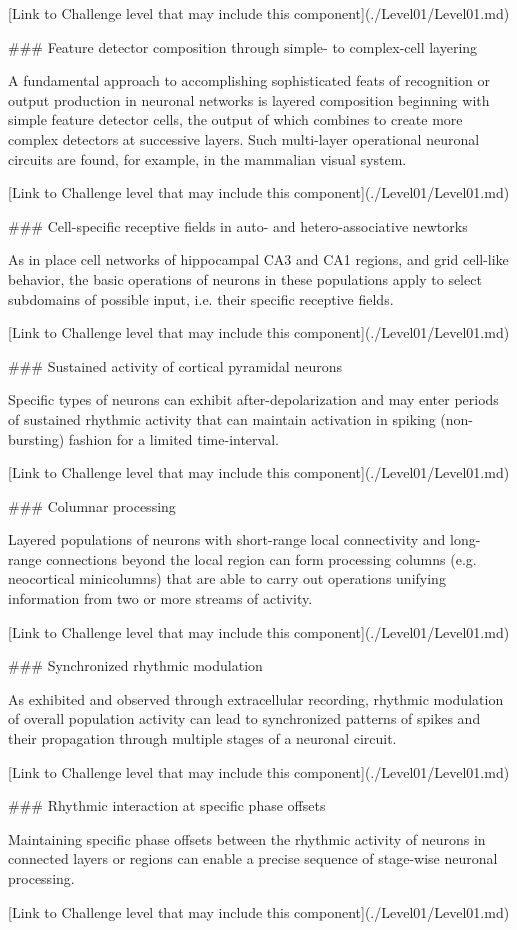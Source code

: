 \documentclass{ldr-article}
\begin{document}
[Link to Challenge level that may include this component](./Level01/Level01.md)

### Feature detector composition through simple- to complex-cell layering

A fundamental approach to accomplishing sophisticated feats of recognition or output
production in neuronal networks is layered composition beginning with simple feature
detector cells, the output of which combines to create more complex detectors at
successive layers. Such multi-layer operational neuronal circuits are found, for example,
in the mammalian visual system.

[Link to Challenge level that may include this component](./Level01/Level01.md)

### Cell-specific receptive fields in auto- and hetero-associative newtorks

As in place cell networks of hippocampal CA3 and CA1 regions, and grid cell-like behavior, the
basic operations of neurons in these populations apply to select subdomains of possible
input, i.e. their specific receptive fields.

[Link to Challenge level that may include this component](./Level01/Level01.md)

### Sustained activity of cortical pyramidal neurons

Specific types of neurons can exhibit after-depolarization and may enter periods of
sustained rhythmic activity that can maintain activation in spiking (non-bursting) fashion
for a limited time-interval.

[Link to Challenge level that may include this component](./Level01/Level01.md)

### Columnar processing

Layered populations of neurons with short-range local connectivity and long-range
connections beyond the local region can form processing columns (e.g. neocortical
minicolumns) that are able to carry out operations unifying information from two or
more streams of activity.

[Link to Challenge level that may include this component](./Level01/Level01.md)

### Synchronized rhythmic modulation

As exhibited and observed through extracellular recording, rhythmic modulation of overall
population activity can lead to synchronized patterns of spikes and their propagation
through multiple stages of a neuronal circuit.

[Link to Challenge level that may include this component](./Level01/Level01.md)

### Rhythmic interaction at specific phase offsets

Maintaining specific phase offsets between the rhythmic activity of neurons in
connected layers or regions can enable a precise sequence of stage-wise neuronal
processing.

[Link to Challenge level that may include this component](./Level01/Level01.md)
\end{document}
